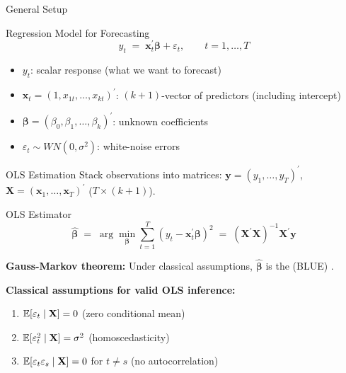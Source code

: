 \documentclass[aspectratio=169, 11pt]{beamer}
\begin{document}
\begin{frame}{General Setup}
  \begin{definitionbox}{Regression Model for Forecasting}
    \[
      y_t \;=\; \mathbf{x}_t^{\prime}\boldsymbol{\beta} + \varepsilon_t,
      \qquad t = 1, \ldots, T
    \]
    \begin{itemize}
      \item $y_t$: scalar response (what we want to forecast)
      \item $\mathbf{x}_t = (1, x_{1t}, \ldots, x_{kt})^{\prime}$:
            $(k+1)$-vector of predictors (including intercept)
      \item $\boldsymbol{\beta} = (\beta_0, \beta_1, \ldots, \beta_k)^{\prime}$:
            unknown coefficients
      \item $\varepsilon_t \sim WN(0, \sigma^2)$: white-noise errors
    \end{itemize}
  \end{definitionbox}
  \vspace{0.2cm}
\end{frame}

\begin{frame}{OLS Estimation}
  Stack observations into matrices: $\mathbf{y} = (y_1, \ldots, y_T)^{\prime}$,
  $\mathbf{X} = (\mathbf{x}_1, \ldots, \mathbf{x}_T)^{\prime}$ ($T \times (k+1)$).

  \vspace{0.2cm}
  \begin{definitionbox}{OLS Estimator}
    \[
      \hat{\boldsymbol{\beta}}
      \;=\; \arg\min_{\boldsymbol{\beta}} \sum_{t=1}^{T}(y_t - \mathbf{x}_t^{\prime}\boldsymbol{\beta})^2
      \;=\; (\mathbf{X}^{\prime}\mathbf{X})^{-1}\mathbf{X}^{\prime}\mathbf{y}
    \]
  \end{definitionbox}
  \vspace{0.15cm}
  \textbf{Gauss-Markov theorem:} Under classical assumptions, $\hat{\boldsymbol{\beta}}$
  is the  (BLUE) \parencite[][Ch.~8]{Hamilton1994}.

  \vspace{0.15cm}
  \textbf{Classical assumptions for valid OLS inference:}
  \begin{enumerate}
    \item $\mathbb{E}[\varepsilon_t \mid \mathbf{X}] = 0$ \hfill (zero conditional mean)
    \item $\mathbb{E}[\varepsilon_t^2 \mid \mathbf{X}] = \sigma^2$ \hfill (homoscedasticity)
    \item $\mathbb{E}[\varepsilon_t \varepsilon_s \mid \mathbf{X}] = 0$ for $t \neq s$ \hfill (no autocorrelation)
  \end{enumerate}
\end{frame}
\end{document}
